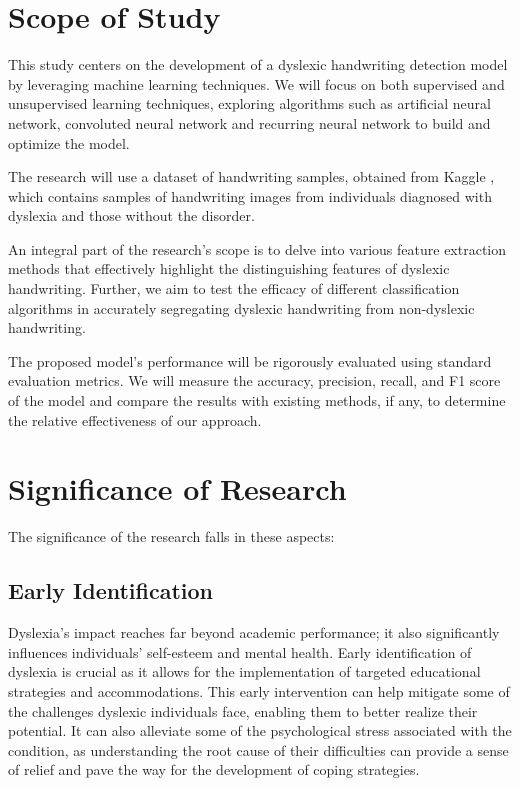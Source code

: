 \newpage
\section{Scope of Study}
This study centers on the development of a dyslexic handwriting detection model by leveraging machine learning techniques. We will focus on both supervised and unsupervised learning techniques, exploring algorithms such as artificial neural network, convoluted neural network and recurring neural network to build and optimize the model.

The research will use a dataset of handwriting samples, obtained from Kaggle \parencite{Isa_2022_Kaggle}, which contains samples of handwriting images from individuals diagnosed with dyslexia and those without the disorder.

An integral part of the research's scope is to delve into various feature extraction methods that effectively highlight the distinguishing features of dyslexic handwriting. Further, we aim to test the efficacy of different classification algorithms in accurately segregating dyslexic handwriting from non-dyslexic handwriting.

The proposed model's performance will be rigorously evaluated using standard evaluation metrics. We will measure the accuracy, precision, recall, and F1 score of the model and compare the results with existing methods, if any, to determine the relative effectiveness of our approach.

\newpage
\section{Significance of Research}
\noindent The significance of the research falls in these aspects:
\subsection{Early Identification}
Dyslexia's impact reaches far beyond academic performance; it also significantly influences individuals' self-esteem and mental health. Early identification of dyslexia is crucial as it allows for the implementation of targeted educational strategies and accommodations. This early intervention can help mitigate some of the challenges dyslexic individuals face, enabling them to better realize their potential. It can also alleviate some of the psychological stress associated with the condition, as understanding the root cause of their difficulties can provide a sense of relief and pave the way for the development of coping strategies.

